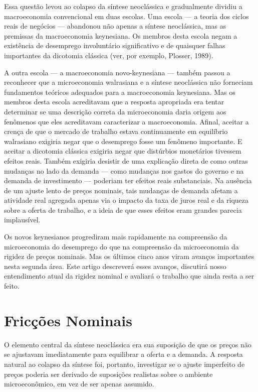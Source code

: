 \documentclass[12pt]{article}
\begin{document}
Essa questão levou ao colapso da síntese neoclássica e gradualmente dividiu a macroeconomia convencional em duas escolas. Uma escola — a teoria dos ciclos reais de negócios — abandonou não apenas a síntese neoclássica, mas as premissas da macroeconomia keynesiana. Os membros desta escola negam a existência de desemprego involuntário significativo e de quaisquer falhas importantes da dicotomia clássica (ver, por exemplo, Plosser, 1989).

A outra escola — a macroeconomia novo-keynesiana — também passou a reconhecer que a microeconomia walrasiana e a síntese neoclássica não forneciam fundamentos teóricos adequados para a macroeconomia keynesiana. Mas os membros desta escola acreditavam que a resposta apropriada era tentar determinar se uma descrição correta da microeconomia daria origem aos fenômenos que eles acreditavam caracterizar a macroeconomia. Afinal, aceitar a crença de que o mercado de trabalho estava continuamente em equilíbrio walrasiano exigiria negar que o desemprego fosse um fenômeno importante. E aceitar a dicotomia clássica exigiria negar que distúrbios monetários tivessem efeitos reais. Também exigiria desistir de uma explicação direta de como outras mudanças no lado da demanda — como mudanças nos gastos do governo e na demanda de investimento — poderiam ter efeitos reais substanciais. Na ausência de um ajuste lento de preços nominais, tais mudanças de demanda afetam a atividade real agregada apenas via o impacto da taxa de juros real e da riqueza sobre a oferta de trabalho, e a ideia de que esses efeitos eram grandes parecia implausível.

Os novos keynesianos progrediram mais rapidamente na compreensão da microeconomia do desemprego do que na compreensão da microeconomia da rigidez de preços nominais. Mas os últimos cinco anos viram avanços importantes nesta segunda área. Este artigo descreverá esses avanços, discutirá nosso entendimento atual da rigidez nominal e avaliará o trabalho que ainda resta a ser feito.

\section*{Fricções Nominais}

O elemento central da síntese neoclássica era sua suposição de que os preços não se ajustavam imediatamente para equilibrar a oferta e a demanda. A resposta natural ao colapso da síntese foi, portanto, investigar se o ajuste imperfeito de preços poderia ser derivado de suposições realistas sobre o ambiente microeconômico, em vez de ser apenas assumido.
\end{document}
